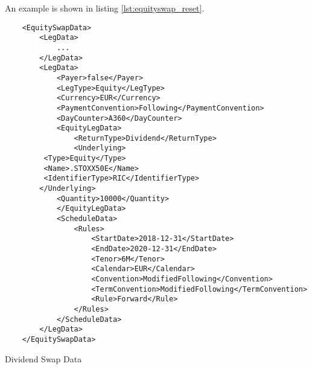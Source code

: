 An example is shown in listing \ref{lst:equityswap_reset}.

\begin{listing}[H]
\begin{verbatim}
    <EquitySwapData>
        <LegData>
            ...
        </LegData>
        <LegData>
            <Payer>false</Payer>
            <LegType>Equity</LegType>
            <Currency>EUR</Currency>
            <PaymentConvention>Following</PaymentConvention>
            <DayCounter>A360</DayCounter>
            <EquityLegData>
                <ReturnType>Dividend</ReturnType>
                <Underlying>
		 <Type>Equity</Type>
		 <Name>.STOXX50E</Name>
		 <IdentifierType>RIC</IdentifierType>
		</Underlying>
	        <Quantity>10000</Quantity>
            </EquityLegData>
            <ScheduleData>
                <Rules>
                    <StartDate>2018-12-31</StartDate>
                    <EndDate>2020-12-31</EndDate>
                    <Tenor>6M</Tenor>
                    <Calendar>EUR</Calendar>
                    <Convention>ModifiedFollowing</Convention>
                    <TermConvention>ModifiedFollowing</TermConvention>
                    <Rule>Forward</Rule>
                </Rules>
            </ScheduleData>
        </LegData>
    </EquitySwapData>
\end{verbatim}
\caption{Dividend Swap Data}
\label{lst:dividendswap}
\end{listing}
